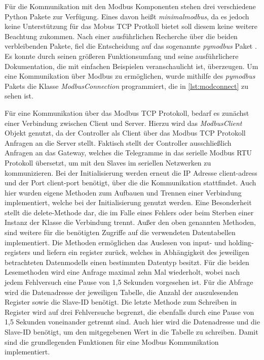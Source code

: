 

Für die Kommunikation mit den Modbus Komponenten stehen drei verschiedene Python Pakete zur Verfügung. Eines davon heißt \textit{minimalmodbus}, da es jedoch keine Unterstützung für das Mobus TCP Protkoll bietet soll diesem keine weitere Beachtung zukommen. Nach einer ausführlichen Recherche über die beiden verbleibenden Pakete, fiel die Entscheidung auf das sogenannte \textit{pymodbus} Paket \cite{pymod} . Es konnte durch seinen größeren Funktionsumfang und seine ausführlichere Dokumentation, die mit einfachen Beispielen veranschaulicht ist, überzeugen.
Um eine Kommunikation über Modbus zu ermöglichen,  wurde mithilfe des \textit{pymodbus} Pakets die Klasse \textit{ModbusConnection}  programmiert, die in \ref{lst:modconnect} zu sehen ist.

Für eine Kommunikation über das Modbus TCP Protokoll, bedarf es zunächst einer Verbindung zwischen Client und Server. Hierzu wird das \textit{ModbusClient} Objekt genutzt, da der Controller als Client über das Modbus TCP Protokoll Anfragen an die Server stellt. Faktisch stellt der Controller ausschließlich Anfragen an das Gateway, welches die Telegramme in das serielle Modbus RTU Protokoll übersetzt, um mit den Slaves im seriellen Netzwerken zu kommunizieren. Bei der Initialisierung werden erneut die IP Adresse client-adress und der Port client-port benötigt, über die die Kommunikation stattfindet. Auch hier wurden eigene Methoden zum Aufbauen und Trennen einer Verbindung implementiert, welche bei der Initialisierung genutzt werden. Eine Besonderheit stellt die delete-Methode dar, die im Falle eines Fehlers oder beim Sterben einer Instanz der Klasse die Verbindung trennt. 
Außer den oben genannten Methoden, sind weitere für die benötigten Zugriffe auf die verwendeten Datentabellen implementiert. Die Methoden ermöglichen das Auslesen von input- und holding-registers und liefern ein register zurück, welches in Abhängigkeit des jeweiligen betrachteten Datenmodells einen bestimmten Datentyp besitzt. Für die beiden Lesemethoden wird eine Anfrage maximal zehn Mal wiederholt, wobei nach jedem Fehlversuch eine Pause von 1,5 Sekunden vorgesehen ist. Für die Abfrage wird die Datenadresse der jeweiligen Tabelle, die Anzahl der auszulesenden Register sowie die Slave-ID benötigt. Die letzte Methode zum Schreiben in Register wird auf drei Fehlversuche begrenzt, die ebenfalls durch eine Pause von 1,5 Sekunden voneinander getrennt sind. Auch hier wird die Datenadresse und die Slave-ID benötigt, um den mitgegebenen Wert in die Tabelle zu schreiben.
Damit sind die grundlegenden Funktionen für eine Modbus Kommunikation implementiert.

